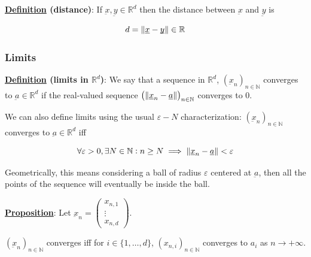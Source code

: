 \documentclass[10pt]{extarticle}
\newcommand{\R}{\mathbb{R}}
\newcommand{\N}{\mathbb{N}}
\newcommand{\munderbar}[1]{\underbar{\ensuremath{#1}}}
\begin{document}
\textbf{\underline{Definition} (distance)}: If $\munderbar{x}, \munderbar{y} \in \R^d$ then the distance between $\munderbar{x}$ and $\munderbar{y}$ is

$$
    d = \norm{\munderbar{x} - \munderbar{y}} \in \R
$$

\subsubsection{Limits}

\textbf{\underline{Definition} (limits in $\R^d$)}:
We say that a sequence in $\R^d$, $\left(\munderbar{x}_n\right)_{n \in \N}$ converges to $\munderbar{a} \in \R^d$ if the real-valued sequence $\left(\norm{\munderbar{x}_n - \munderbar{a}}\right)_{n \in \N}$ converges to 0.

We can also define limits using the usual $\varepsilon - N$ characterization: $\left(\munderbar{x}_n\right)_{n \in \N}$ converges to $\munderbar{a} \in \R^d$ iff

$$
    \forall \varepsilon > 0, \exists N \in \N : n \geq N \implies \norm{\munderbar{x}_n - \munderbar{a}} < \varepsilon
$$

Geometrically, this means considering a ball of radius $\varepsilon$ centered at $\munderbar{a}$, then all the points of the sequence will eventually be inside the ball.

\textbf{\underline{Proposition}}:
Let $\munderbar{x}_n = \begin{pmatrix}
        x_{n,1} \\ \vdots \\ x_{n,d}
    \end{pmatrix}$.

$\left(\munderbar{x}_n\right)_{n \in \N}$ converges iff for $i \in \{1, \ldots, d\}$, $\left(x_{n,i}\right)_{n \in \N}$ converges to $a_i$ as $n \to +\infty$.
\end{document}
